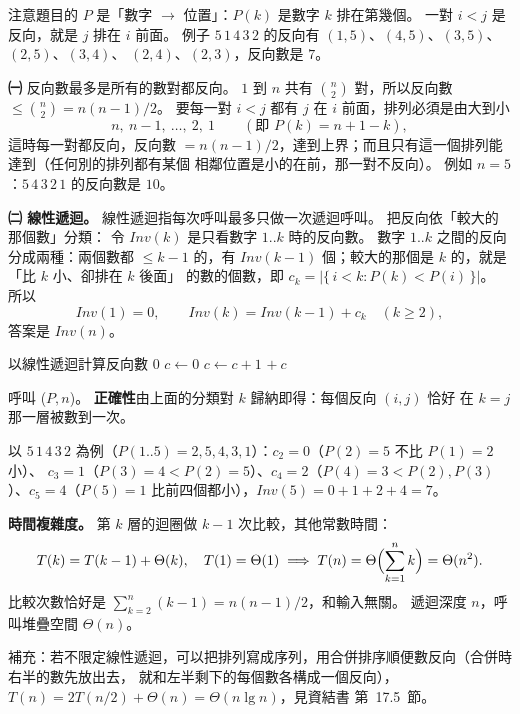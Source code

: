 \begin{pastsoln}
注意題目的 $P$ 是「數字 $\to$ 位置」：$P(k)$ 是數字 $k$ 排在第幾個。 一對 $i < j$ 是反向，就是
$j$ 排在 $i$ 前面。 例子 $5\,1\,4\,3\,2$ 的反向有 $(1,5)$、$(4,5)$、$(3,5)$、$(2,5)$、$(3,4)$、
$(2,4)$、$(2,3)$，反向數是 $7$。

\textbf{㈠} 反向數最多是所有的數對都反向。 $1$ 到 $n$ 共有 $\binom{n}{2}$ 對，所以反向數
$\le \binom{n}{2} = n(n-1)/2$。 要每一對 $i < j$ 都有 $j$ 在 $i$ 前面，排列必須是由大到小
\[
n,\ n-1,\ \ldots,\ 2,\ 1 \qquad (\text{即 } P(k) = n + 1 - k),
\]
這時每一對都反向，反向數 $= n(n-1)/2$，達到上界；而且只有這一個排列能達到（任何別的排列都有某個
相鄰位置是小的在前，那一對不反向）。 例如 $n = 5$：$5\,4\,3\,2\,1$ 的反向數是 $10$。

\textbf{㈡ 線性遞迴。} 線性遞迴指每次呼叫最多只做一次遞迴呼叫。 把反向依「較大的那個數」分類：
令 $\mathit{Inv}(k)$ 是只看數字 $1..k$ 時的反向數。 數字 $1..k$ 之間的反向分成兩種：兩個數都
$\le k - 1$ 的，有 $\mathit{Inv}(k-1)$ 個；較大的那個是 $k$ 的，就是「比 $k$ 小、卻排在 $k$ 後面」
的數的個數，即 $c_k = |\{\, i < k : P(k) < P(i) \,\}|$。 所以
\[
\mathit{Inv}(1) = 0, \qquad \mathit{Inv}(k) = \mathit{Inv}(k-1) + c_k \quad (k \ge 2),
\]
答案是 $\mathit{Inv}(n)$。
\begin{pseudo}{以線性遞迴計算反向數}
 
        \State \Return $0$
    \EndIf
    \State $c \gets 0$
         
            \State $c \gets c + 1$
        \EndIf
    \EndFor
    \State \Return {} $+\ c$ 
\EndFunction
\end{pseudo}
呼叫 ($P, n$)。 \textbf{正確性}由上面的分類對 $k$ 歸納即得：每個反向 $(i, j)$ 恰好
在 $k = j$ 那一層被數到一次。

以 $5\,1\,4\,3\,2$ 為例（$P(1..5) = 2, 5, 4, 3, 1$）：$c_2 = 0$（$P(2) = 5$ 不比 $P(1) = 2$ 小）、
$c_3 = 1$（$P(3) = 4 < P(2) = 5$）、$c_4 = 2$（$P(4) = 3 < P(2), P(3)$）、$c_5 = 4$（$P(5) = 1$
比前四個都小），$\mathit{Inv}(5) = 0 + 1 + 2 + 4 = 7$。

\textbf{時間複雜度。} 第 $k$ 層的迴圈做 $k - 1$ 次比較，其他常數時間：
\[
T(k) = T(k-1) + \Theta(k), \quad T(1) = \Theta(1)
\;\Longrightarrow\;
T(n) = \Theta\Bigl(\sum_{k=1}^{n} k\Bigr) = \Theta(n^2).
\]
比較次數恰好是 $\sum_{k=2}^{n} (k-1) = n(n-1)/2$，和輸入無關。 遞迴深度 $n$，呼叫堆疊空間
$\Theta(n)$。

補充：若不限定線性遞迴，可以把排列寫成序列，用合併排序順便數反向（合併時右半的數先放出去，
就和左半剩下的每個數各構成一個反向），$T(n) = 2T(n/2) + \Theta(n) = \Theta(n \lg n)$，見資結書
第~17.5~節。
\end{pastsoln}
